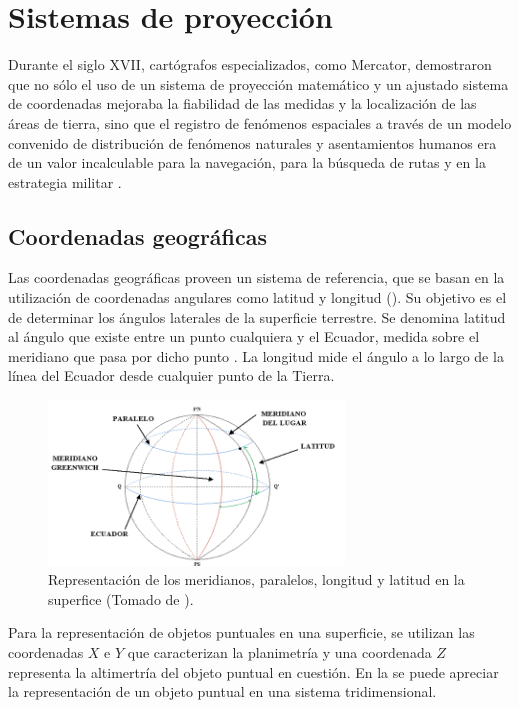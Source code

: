 \section{Sistemas de proyección}
\label{sec:cap2-sistemas-de-proyeccion}
Durante el siglo XVII, cartógrafos especializados, como Mercator, demostraron que no sólo el uso de
un sistema de proyección matemático y un ajustado sistema de coordenadas mejoraba la fiabilidad de
las medidas y la localización de las áreas de tierra, sino que el registro de fenómenos espaciales
a través de un modelo convenido de distribución de fenómenos naturales y asentamientos humanos era
de un valor incalculable para la navegación, para la búsqueda de rutas y en la estrategia militar
\citep{llopis2006sistemas}.

\subsection{Coordenadas geográficas}
Las coordenadas geográficas proveen un sistema de referencia, que se basan en la utilización de
coordenadas angulares como latitud y longitud (). Su objetivo es el de
determinar los ángulos laterales de la superficie terrestre. Se denomina latitud al ángulo que
existe entre un punto cualquiera y el Ecuador, medida sobre el meridiano que pasa por dicho punto
\citep{fAlonsoSig2006}. La longitud mide el ángulo a lo largo de la línea del Ecuador desde
cualquier punto de la Tierra\citep{fAlonsoSig2006}.

\begin{figure}[!htbp]
\centering
\includegraphics[width=0.7\textwidth]{capitulo-2/graphics/ejes-tierra.png}
\caption{\label{fig:sig-plano} Representación de los meridianos, paralelos, longitud y latitud en la superfice (Tomado de \cite{website:emcLonLat2014}).}
\end{figure}


Para la representación de objetos puntuales en una superficie, se utilizan las coordenadas $X$ e
$Y$ que caracterizan la planimetría y una coordenada $Z$ representa la altimertría del objeto
puntual en cuestión. En la  se puede apreciar la representación de un objeto
puntual en una sistema tridimensional.

